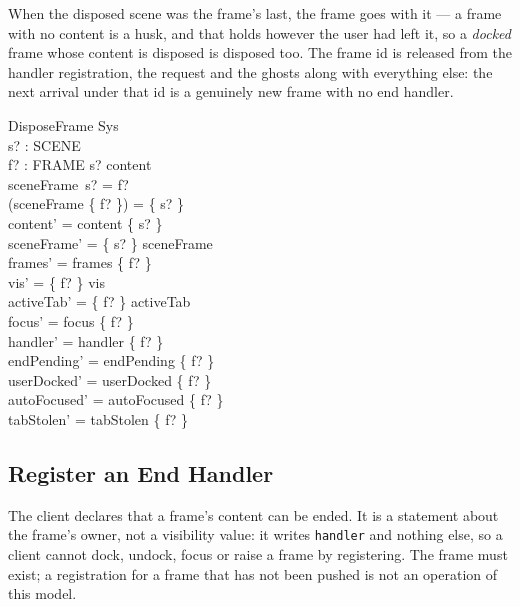 \documentclass[a4paper,10pt,fleqn]{article}
\begin{document}
When the disposed scene was the frame's last, the frame goes with it --- a
frame with no content is a husk, and that holds however the user had left it,
so a \emph{docked} frame whose content is disposed is disposed too.  The frame
id is released from the handler registration, the request and the ghosts
along with everything else: the next arrival under that id is a genuinely new
frame with no end handler.

\begin{schema}{DisposeFrame}
  \Delta Sys \\
  s? : SCENE \\
  f? : FRAME
\where
  s? \in content \\
  sceneFrame~s? = f? \\
  \dom (sceneFrame \rres \{ f? \}) = \{ s? \} \\
  content' = content \setminus \{ s? \} \\
  sceneFrame' = \{ s? \} \ndres sceneFrame \\
  frames' = frames \setminus \{ f? \} \\
  vis' = \{ f? \} \ndres vis \\
  activeTab' = \{ f? \} \ndres activeTab \\
  focus' = focus \setminus \{ f? \} \\
  handler' = handler \setminus \{ f? \} \\
  endPending' = endPending \setminus \{ f? \} \\
  userDocked' = userDocked \setminus \{ f? \} \\
  autoFocused' = autoFocused \setminus \{ f? \} \\
  tabStolen' = tabStolen \setminus \{ f? \}
\end{schema}

\subsection{Register an End Handler}

The client declares that a frame's content can be ended.  It is a statement
about the frame's owner, not a visibility value: it writes \texttt{handler}
and nothing else, so a client cannot dock, undock, focus or raise a frame by
registering.  The frame must exist; a registration for a frame that has not
been pushed is not an operation of this model.
\end{document}
